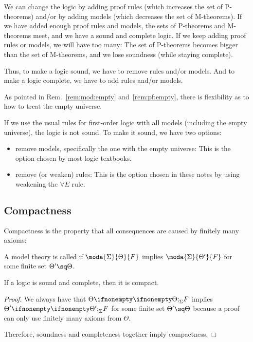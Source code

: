 We can change the logic by adding proof rules (which increases the set of P-theorems) and/or by adding models (which decreases the set of M-theorems).
If we have added enough proof rules and models, the sets of P-theorems and M-theorems meet, and we have a sound and complete logic.
If we keep adding proof rules or models, we will have too many: The set of P-theorems becomes bigger than the set of M-theorems, and we lose soundness (while staying complete).

Thus, to make a logic sound, we have to remove rules and/or models.
And to make a logic complete, we have to add rules and/or models.

\begin{example}
As pointed in Rem.~\ref{rem:mod:empty} and~\ref{rem:pf:empty}, there is flexibility as to how to treat the empty universe.

If we use the usual rules for first-order logic with all models (including the empty universe), the logic is not sound.
To make it sound, we have two options:
\begin{itemize}
  \item remove models, specifically the one with the empty universe: This is the option chosen by most logic textbooks.
  \item remove (or weaken) rules: This is the option chosen in these notes by using weakening the $\forall E$ rule.
\end{itemize}
\end{example}


\subsection{Compactness}

Compactness is the property that all consequences are caused by finitely many axioms:

\begin{definition}
A model theory is called  if $\moda{\Sigma}{\Theta}{F}$ implies $\moda{\Sigma}{\Theta'}{F}$ for some finite set $\Theta'\sq\Theta$.
\end{definition}

\begin{theorem}
If a logic is sound and complete, then it is compact.
\end{theorem}
\begin{proof}
We always have that $\iscons{\Sigma}{\Theta}{}{F}$ implies $\iscons{\Sigma}{\Theta'}{}{F}$ for some finite set $\Theta'\sq\Theta$ because a proof can only use finitely many axioms from $\Theta$.

Therefore, soundness and completeness together imply compactness.
\end{proof}

